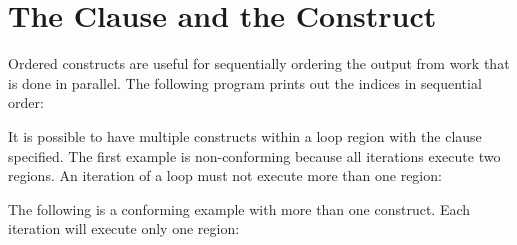 \pagebreak
\chapter{The  Clause and the  Construct}
\label{chap:ordered}

Ordered constructs  are useful for sequentially ordering the output from work that 
is done in parallel. The following program prints out the indices in sequential 
order:



It is possible to have multiple  constructs within a loop region 
with the  clause specified. The first example is non-conforming 
because all iterations execute two  regions. An iteration of a 
loop must not execute more than one  region:



The following is a conforming example with more than one  construct. 
Each iteration will execute only one  region:



